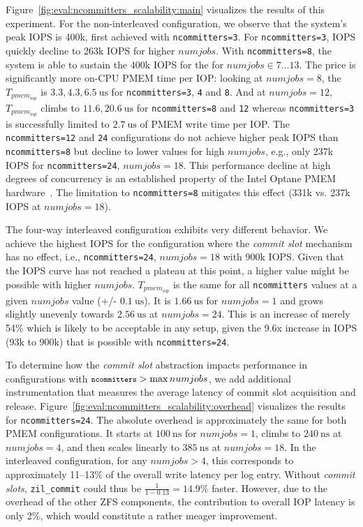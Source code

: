 \documentclass[12pt,a4paper,twoside]{book}
\begin{document}
{Figure~\ref{fig:eval:ncommitters_scalability:main} visualizes the results of this experiment.
For the non-interleaved configuration, we observe that the system's peak IOPS is 400k, first achieved with \lstinline{ncommitters=3}.
For \lstinline{ncommitters=3}, IOPS quickly decline to 263k IOPS for higher $numjobs$.
With \lstinline{ncommitters=8}, the system is able to sustain the 400k IOPS for the for $numjobs \in 7 \dots 13$.
The price is significantly more on-CPU PMEM time per IOP:
looking at $numjobs = 8$, the $T_{pmem_{iop}}$ is $3.3, 4.3, 6.5~\text{us}$ for \lstinline{ncommitters=3}, \lstinline{4} and \lstinline{8}.
And at $numjobs = 12$, $T_{pmem_{iop}}$ climbs to $11.6, 20.6~\text{us}$ for \lstinline{ncommitters=8} and \lstinline{12} whereas \lstinline{ncommitters=3} is successfully limited to $2.7~\text{us}$ of PMEM write time per IOP.
The \lstinline{ncommitters=12} and \lstinline{24} configurations do not achieve higher peak IOPS than \lstinline{ncommitters=8} but decline to lower values for high $numjobs$, e.g., only 237k IOPS for \lstinline{ncommitters=24}, $numjobs = 18$.
This performance decline at high degrees of concurrency is an established property of the Intel Optane PMEM hardware~\cite{yangEmpiricalGuideBehavior2020}.
The limitation to \lstinline{ncommitters=8} mitigates this effect (331k vs. 237k IOPS at $numjobs = 18$).

The four-way interleaved configuration exhibits very different behavior.
We achieve the highest IOPS for the configuration where the \textit{commit slot} mechanism has no effect, i.e., \lstinline{ncommitters=24}, $numjobs = 18$ with 900k IOPS.
Given that the IOPS curve has not reached a plateau at this point, a higher value might be possible with higher $numjobs$.
$T_{pmem_{iop}}$ is the same for all \lstinline{ncommitters} values at a given $numjobs$ value (+/- $0.1~\text{us}$).
It is $1.66~\text{us}$ for $numjobs = 1$ and grows slightly unevenly towards $2.56~\text{us}$ at $numjobs = 24$.
This is an increase of merely 54\% which is likely to be acceptable in any setup, given the 9.6x increase in IOPS (93k to 900k) that is possible with \lstinline{ncommitters=24}.

To determine how the \textit{commit slot} abstraction impacts performance in configurations with ${\texttt{\footnotesize ncommitters}} > \max numjobs$, we add additional instrumentation that measures the average latency of commit slot acquisition and release.
Figure~\ref{fig:eval:ncommitters_scalability:overhead} visualizes the results for \lstinline{ncommitters=24}.
The absolute overhead is approximately the same for both PMEM configurations.
It starts at $100~\text{ns}$ for $numjobs = 1$, climbs to $240~\text{ns}$ at $numjobs = 4$, and then scales linearly to $385~\text{ns}$ at $numjobs = 18$.
In the interleaved configuration, for any $numjobs > 4$, this corresponds to approximately 11--13\% of the overall write latency per log entry.
Without \textit{commit slots}, \lstinline{zil_commit} could thus be $\frac{1}{1 - 0.13} = 14.9\%$ faster.
However, due to the overhead of the other ZFS components, the contribution to overall IOP latency is only 2\%, which would constitute a rather meager improvement.

}
\end{document}
